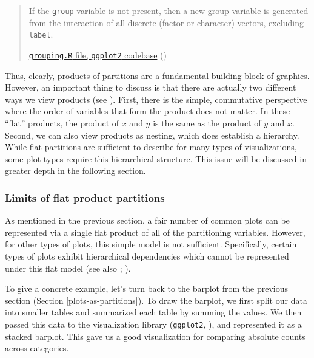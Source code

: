 \documentclass[
  openany]{book}
\theoremstyle{definition}
\theoremstyle{definition}
\theoremstyle{definition}
\theoremstyle{definition}
\theoremstyle{remark}
\begin{document}
\begin{quote}
If the \texttt{group} variable is not present, then a new group variable is generated from the interaction of all discrete (factor or character) vectors, excluding \texttt{label}.

\href{https://github.com/tidyverse/ggplot2/blob/f46805349d6ca8ca7a99f8966cfa0f29279c2f6c/R/grouping.R\#L7}{\texttt{grouping.R} file, \texttt{ggplot2} codebase} ()
\end{quote}

Thus, clearly, products of partitions are a fundamental building block of graphics. However, an important thing to discuss is that there are actually two different ways we view products (see ). First, there is the simple, commutative perspective where the order of variables that form the product does not matter. In these ``flat'' products, the product of \(x\) and \(y\) is the same as the product of \(y\) and \(x\). Second, we can also view products as nesting, which does establish a hierarchy. While flat partitions are sufficient to describe for many types of visualizations, some plot types require this hierarchical structure. This issue will be discussed in greater depth in the following section.

\subsubsection{Limits of flat product partitions}\label{limits-of-flat-products}

As mentioned in the previous section, a fair number of common plots can be represented via a single flat product of all of the partitioning variables. However, for other types of plots, this simple model is not sufficient. Specifically, certain types of plots exhibit hierarchical dependencies which cannot be represented under this flat model (see also ; ).

To give a concrete example, let's turn back to the barplot from the previous section (Section \ref{plots-as-partitions}). To draw the barplot, we first split our data into smaller tables and summarized each table by summing the values. We then passed this data to the visualization library (\texttt{ggplot2}, ), and represented it as a stacked barplot. This gave us a good visualization for comparing absolute counts across categories.
\end{document}
